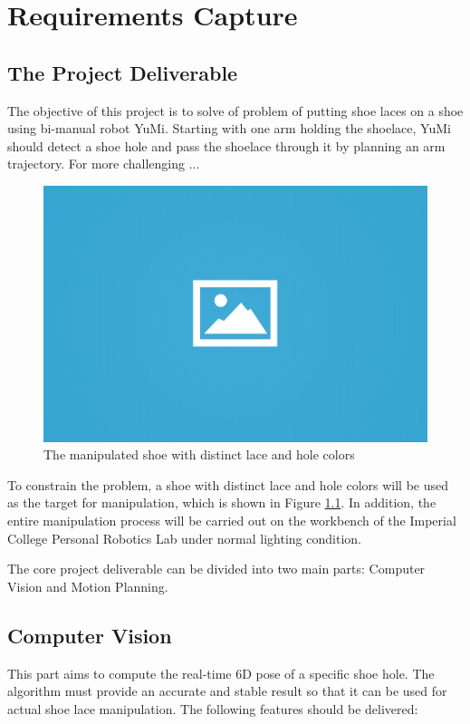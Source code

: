 \chapter{Requirements Capture}

\section{The Project Deliverable}
The objective of this project is to solve of problem of putting shoe laces on a shoe using bi-manual robot YuMi. Starting with one arm holding the shoelace, YuMi should detect a shoe hole and pass the shoelace through it by planning an arm trajectory. For more challenging ...

\begin{figure}[H]
\centering
\includegraphics[width = 0.5\columnwidth]{images/ph.png}
\caption{The manipulated shoe with distinct lace and hole colors}
\label{shoe}
\end{figure}

To constrain the problem, a shoe with distinct lace and hole colors will be used as the target for manipulation, which is shown in Figure \ref{shoe}. In addition, the entire manipulation process will be carried out on the workbench of the Imperial College Personal Robotics Lab under normal lighting condition.

The core project deliverable can be divided into two main parts: Computer Vision and Motion Planning.

\section{Computer Vision}
This part aims to compute the real-time 6D pose of a specific shoe hole. The algorithm must provide an accurate and stable result so that it can be used for actual shoe lace manipulation. The following features should be delivered:

